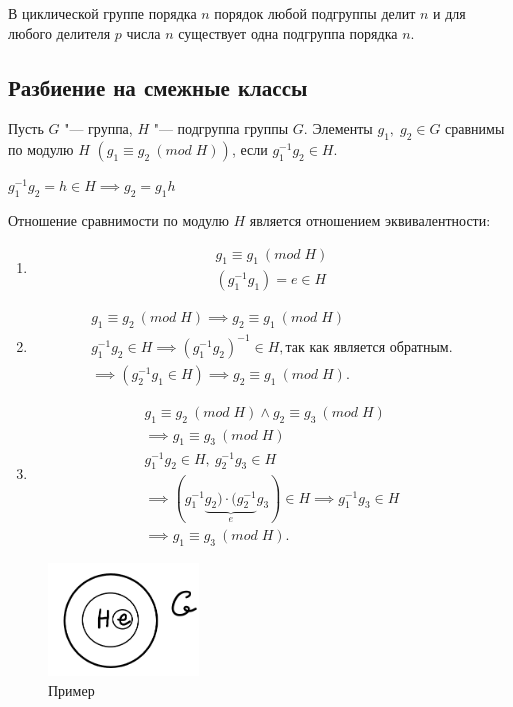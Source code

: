 В циклической группе порядка $n$ порядок любой подгруппы делит $n$ и для любого делителя $p$ числа $n$ существует одна подгруппа порядка $n$.

\subsection*{Разбиение на смежные классы}

\begin{definition}
  Пусть $G$ "--- группа, $H$ "--- подгруппа группы $G$. Элементы $g_1,\; g_2 \in G$ сравнимы по модулю $H$ $(g_1 \equiv g_2~(mod\;H))$, если $g_1^{-1}g_2 \in H$.

  $g_1^{-1}g_2 = h\in H \implies g_2 = g_1h$
\end{definition}

Отношение сравнимости по модулю $H$ является отношением эквивалентности:
\begin{enumerate}
  \item \begin{gather*}
    g_1 \equiv g_1~(mod\;H)\\
    (g_1^{-1}g_1) = e \in H
  \end{gather*}
  \item \begin{gather*}
    g_1 \equiv g_2~(mod\;H) \implies g_2 \equiv g_1~(mod\;H)\\
    g_1^{-1}g_2 \in H \implies (g_1^{-1}g_2)^{-1} \in H, \text{так как является обратным}.\\
    \implies (g_2^{-1}g_1 \in H) \implies g_2 \equiv g_1~(mod\;H).
  \end{gather*}
  \item \begin{gather*}
    g_1 \equiv g_2~(mod\;H) \wedge g_2 \equiv g_3~(mod\;H)\\
    \implies g_1 \equiv g_3~(mod\;H)\\
    g_1^{-1}g_2 \in H,~ g_2^{-1}g_3 \in H\\
    \implies (g_1^{-1}\underbrace{g_2)\cdot (g_2^{-1}}_{e} g_3) \in H \implies g_1^{-1}g_3 \in H\\
    \implies g_1\equiv g_3~(mod\;H).
  \end{gather*}
\end{enumerate}

\begin{figure}[H]
  \centering
  \includegraphics[height = 3cm]{images/groups_module.png}
  \caption{Пример}
\end{figure}


